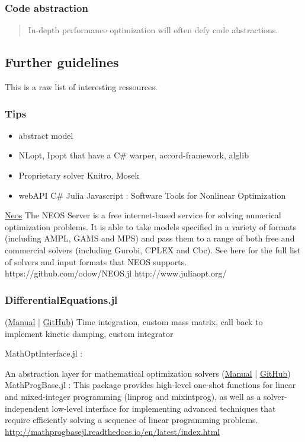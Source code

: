 \subsubsection{Code abstraction}
\blockcquote[p.~155]{Watson2014}{In-depth performance optimization will often defy code abstractions.}

\subsection{Further guidelines}
This is a raw list of interesting ressources.
\subsubsection{Tips}

\begin{itemize}
\item abstract model
\item NLopt, Ipopt that have a C\# warper, accord-framework, alglib
\item Proprietary solver Knitro, Mosek
\item webAPI C\# Julia Javascript
\cite{Moulard2014} : Software Tools for Nonlinear Optimization
\end{itemize}

\href{https://neos-guide.org/}{Neos}
The NEOS Server is a free internet-based service for solving numerical optimization problems. It is able to take models specified in a variety of formats (including AMPL, GAMS and MPS) and pass them to a range of both free and commercial solvers (including Gurobi, CPLEX and Cbc). See here for the full list of solvers and input formats that NEOS supports.
https://github.com/odow/NEOS.jl
http://www.juliaopt.org/

\subsubsection{DifferentialEquations.jl}
(\href{http://docs.juliadiffeq.org/latest/index.html}{Manual} | \href{https://github.com/JuliaDiffEq}{GitHub})
Time integration, custom mass matrix, call back to implement kinetic damping, custom integrator

MathOptInterface.jl :

An abstraction layer for mathematical optimization solvers (\href{http://www.juliaopt.org/MathOptInterface.jl/latest/apimanual.html}{Manual} | \href{https://github.com/JuliaOpt/MathOptInterface.jl}{GitHub})
MathProgBase.jl : 
This package provides high-level one-shot functions for linear and mixed-integer programming (linprog and mixintprog), as well as a solver-independent low-level interface for implementing advanced techniques that require efficiently solving a sequence of linear programming problems.
\url{http://mathprogbasejl.readthedocs.io/en/latest/index.html}

